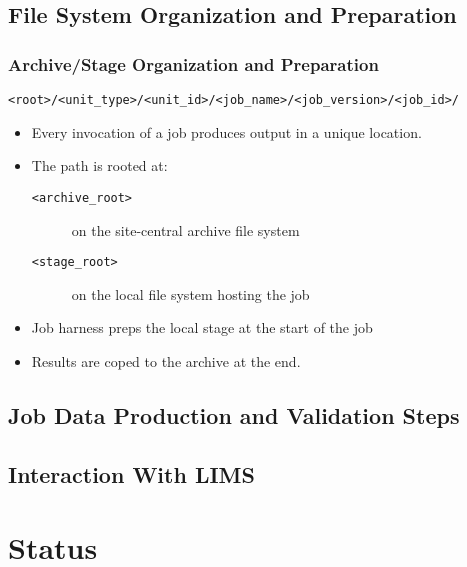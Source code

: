 \documentclass[xcolor=dvipsnames]{beamer}
\newcommand{\code}[1]{\texttt{#1}}
\begin{document}
\subsection{File System Organization and Preparation}

\begin{frame}
  \frametitle{Archive/Stage Organization and Preparation}
  {\footnotesize
    \begin{center}
      \code{<root>/<unit\_type>/<unit\_id>/<job\_name>/<job\_version>/<job\_id>/}
    \end{center}}
  \begin{itemize}
  \item Every invocation of a job produces output in a unique location.
  \item The path is rooted at:
    \begin{description}
    \item[\code{<archive\_root>}] on the site-central archive file system
    \item[\code{<stage\_root>}] on the local file system hosting the job
    \end{description}
  \item Job harness preps the local stage at the start of the job
  \item Results are coped to the archive at the end.
  \end{itemize}

\end{frame}

\subsection{Job Data Production and Validation Steps}

\begin{frame}
\end{frame}

\subsection{Interaction With LIMS}

\begin{frame}
\end{frame}

\section{Status}

\begin{frame}
\end{frame}
\end{document}
